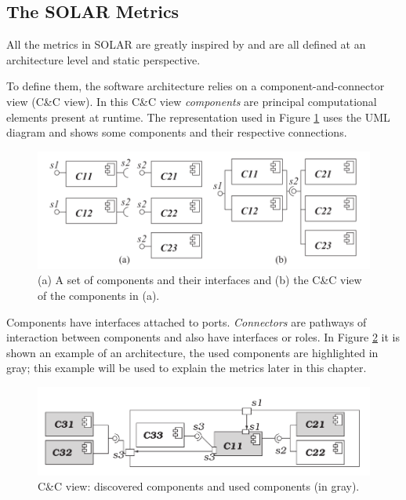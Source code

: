 \subsection{The SOLAR Metrics}
\label{subsec:solar-metrics}
All the metrics in SOLAR are greatly inspired by \cite{po-metrics} and are all defined at an architecture level and static perspective. 

To define them, the software architecture relies on a component-and-connector view (C\&C view). In this C\&C view \emph{components} are principal computational elements present at runtime. The representation used in Figure \ref{fig:comp-example} uses the UML diagram and shows some components and their respective connections.

\begin{figure}[ht]
	\centerline
	{\includegraphics[scale=0.55]{img/solar-comp-example.png}}
	\caption[SOLAR Components example]{(a) A set of components and their interfaces and (b) the C\&C view of the components in (a)\cite{solar}.}
	\label{fig:comp-example}
\end{figure}

Components have interfaces attached to ports. \emph{Connectors} are pathways of interaction between components and also have interfaces or roles. In Figure \ref{fig:solar-arch-example} it is shown an example of an architecture, the used components are highlighted in gray; this example will be used to explain the metrics later in this chapter.

\begin{figure}[ht]
	\centerline
	{\includegraphics[scale=0.55]{img/solar-arch-example.png}}
	\caption[SOLAR example architecure]{C\&C view: discovered components and used components (in gray).\cite{solar}}
	\label{fig:solar-arch-example}
\end{figure}

